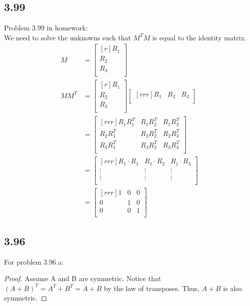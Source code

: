 \documentclass{report}
\begin{document}
\subsection{3.99}
Problem 3.99 in homework:\\
We need to solve the unknowns such that $M^TM$ is equal to the identity matrix.
	\begin{align*}
	M &= \begin{bmatrix}[r] R_1\\ R_2\\ R_3\\ \end{bmatrix}\\
	MM^T &= \begin{bmatrix}[r] R_1\\ R_2\\ R_3\\ \end{bmatrix}
	\begin{bmatrix}[rrr] R_1 & R_2 & R_3\\ \end{bmatrix}\\
	&=
	\begin{bmatrix}[rrr]
	R_1R_1^T & R_1R_2^T & R_1R_3^T\\
	R_2R_1^T & R_2R_2^T & R_2R_3^T\\
	R_3R_1^T & R_3R_2^T & R_3R_3^T\\
	\end{bmatrix}\\
	&=
	\begin{bmatrix}[rrr]
	R_1 \cdot R_1 & R_1 \cdot R_2 & R_1 \cdot R_3\\
	\vdots & \vdots & \vdots\\
	\vdots & \vdots & \vdots\\
	\end{bmatrix}\\
	&=
	\begin{bmatrix}[rrr]
	1 & 0 & 0\\
	0 & 1 & 0\\
	0 & 0 & 1\\
	\end{bmatrix}
	\end{align*}
\subsection{3.96}
For problem 3.96.a:\\
\begin{proof}
Assume A and B are symmetric. Notice that $(A+B)^T=A^T+B^T = A + B$ by the law of transposes. Thus, $A+B$ is also symmetric.
\end{proof}
\end{document}
